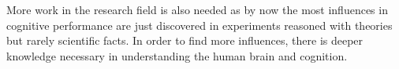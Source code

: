 More work in the research field is also needed as by now the most influences in cognitive performance are just discovered in experiments reasoned with theories but rarely scientific facts. In order to find more influences, there is deeper knowledge necessary in understanding the human brain and cognition. 

